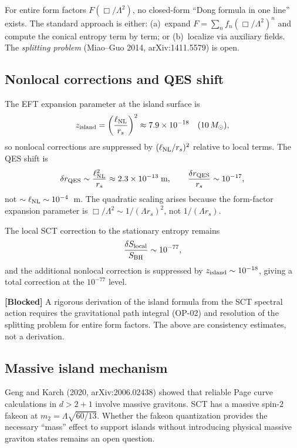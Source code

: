 \documentclass[11pt,a4paper]{article}
\theoremstyle{plain}
\theoremstyle{definition}
\newcommand{\blocked}[1]{%
  \par\smallskip\noindent
  \colorbox{red!10}{\parbox{\dimexpr\linewidth-2\fboxsep}{%
    \textcolor{red!60!black}{\textbf{[Blocked]}} #1}}%
  \par\smallskip}
\begin{document}
For entire form factors $F(\Box/\Lambda^2)$, no closed-form ``Dong
formula in one line'' exists.  The standard approach is either:
(a)~expand $F = \sum_n f_n(\Box/\Lambda^2)^n$ and compute the
conical entropy term by term; or (b)~localize via auxiliary fields.
The \emph{splitting problem} (Miao--Guo 2014, arXiv:1411.5579) is open.

\subsection{Nonlocal corrections and QES shift}

The EFT expansion parameter at the island surface is
\begin{equation}
z_{\rm island} = \left(\frac{\ell_{\rm NL}}{r_s}\right)^2
  \approx 7.9 \times 10^{-18} \quad (10\,M_\odot),
\end{equation}
so nonlocal corrections are suppressed by $(\ell_{\rm NL}/r_s)^2$
relative to local terms.  The QES shift is
\begin{equation}
\delta r_{\rm QES} \sim \frac{\ell_{\rm NL}^2}{r_s}
  \approx 2.3 \times 10^{-13}\;\text{m},
\qquad
\frac{\delta r_{\rm QES}}{r_s} \sim 10^{-17},
\end{equation}
not $\sim \ell_{\rm NL} \sim 10^{-4}$~m.  The quadratic scaling
arises because the form-factor expansion parameter is
$\Box/\Lambda^2 \sim 1/(\Lambda r_s)^2$, not $1/(\Lambda r_s)$.

The local SCT correction to the stationary entropy remains
\begin{equation}
\frac{\delta S_{\rm local}}{S_{\rm BH}} \sim 10^{-77},
\end{equation}
and the additional nonlocal correction is suppressed by $z_{\rm island}
\sim 10^{-18}$, giving a total correction at the $10^{-77}$ level.

\blocked{A rigorous derivation of the island formula from the SCT
  spectral action requires the gravitational path integral (OP-02)
  and resolution of the splitting problem for entire form factors.
  The above are consistency estimates, not a derivation.}

\subsection{Massive island mechanism}

Geng and Karch (2020, arXiv:2006.02438) showed that reliable Page
curve calculations in $d > 2+1$ involve massive gravitons.  SCT has
a massive spin-2 fakeon at $m_2 = \Lambda\sqrt{60/13}$.  Whether
the fakeon quantization provides the necessary ``mass'' effect to
support islands without introducing physical massive graviton states
remains an open question.
\end{document}
